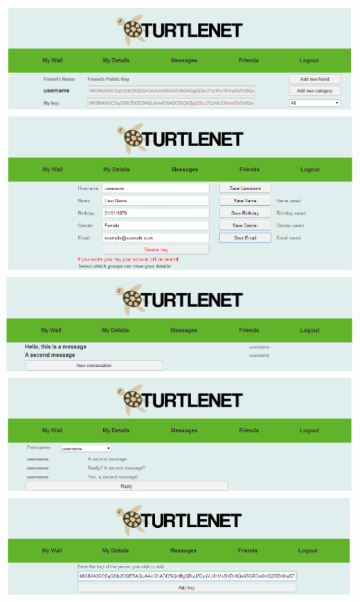 \includegraphics[scale=0.2]{images/screenshots/crop9.png}
\includegraphics[scale=0.2]{images/screenshots/crop10.png}
\includegraphics[scale=0.2]{images/screenshots/crop11.png}
\includegraphics[scale=0.2]{images/screenshots/crop12.png}
\includegraphics[scale=0.2]{images/screenshots/crop13.png}